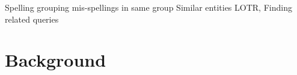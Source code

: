 \documentclass[11pt]{article}
\begin{document}

Spelling {grouping mis-spellings in same group}
Similar entities {LOTR,}
Finding related queries

 \section{Background}


%
%
\end{document}
